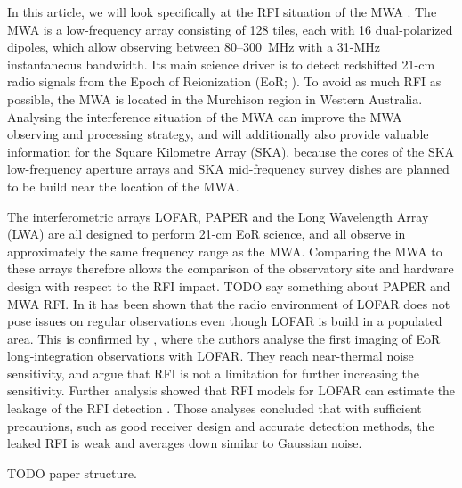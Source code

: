 \documentclass{pasa}
\begin{document}
In this article, we will look specifically at the RFI situation of the MWA \citep{mwa}. The MWA is a low-frequency array consisting of 128 tiles, each with 16 dual-polarized dipoles, which allow observing between 80--300~MHz with a 31-MHz instantaneous bandwidth. Its main science driver is to detect redshifted 21-cm radio signals from the Epoch of Reionization (EoR; \citealt{bowman-science-with-the-mwa-2013}). To avoid as much RFI as possible, the MWA is located in the Murchison region in Western Australia. Analysing the interference situation of the MWA can improve the MWA observing and processing strategy, and will additionally also provide valuable information for the Square Kilometre Array (SKA), because the cores of the SKA low-frequency aperture arrays and SKA mid-frequency survey dishes are planned to be build near the location of the MWA.

The interferometric arrays LOFAR, PAPER and the Long Wavelength Array (LWA) are all designed to perform 21-cm EoR science, and all observe in approximately the same frequency range as the MWA. Comparing the MWA to these arrays therefore allows the comparison of the observatory site and hardware design with respect to the RFI impact. TODO say something about PAPER and MWA RFI. In \citet{lofar-radio-environment} it has been shown that the radio environment of LOFAR does not pose issues on regular observations even though LOFAR is build in a populated area. This is confirmed by \citet{ncp-eor-yatawatta}, where the authors analyse the first imaging of EoR long-integration observations with LOFAR. They reach near-thermal noise sensitivity, and argue that RFI is not a limitation for further increasing the sensitivity. Further analysis showed that RFI models for LOFAR can estimate the leakage of the RFI detection \citep{offringa-rfi-distributions}. Those analyses concluded that with sufficient precautions, such as good receiver design and accurate detection methods, the leaked RFI is weak and averages down similar to Gaussian noise.

TODO paper structure.
\end{document}
